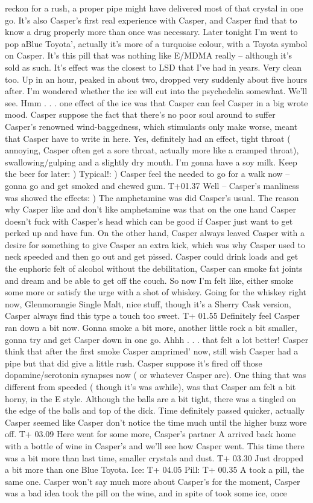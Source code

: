 \documentclass[12pt]{book}
\begin{document}
reckon for a rush, a proper pipe might have delivered most of that crystal in one go. It's also Casper's first real experience with Casper, and Casper find that to know a drug properly more than once was necessary. Later tonight I'm went to pop aBlue Toyota', actually it's more of a turquoise colour, with a Toyota symbol on Casper. It's this pill that was nothing like E/MDMA really -- although it's sold as such. It's effect was the closest to LSD that I've had in years. Very clean too. Up in an hour, peaked in about two, dropped very suddenly about five hours after. I'm wondered whether the ice will cut into the psychedelia somewhat. We'll see. Hmm . . .  one effect of the ice was that Casper can feel Casper in a big wrote mood. Casper suppose the fact that there's no poor soul around to suffer Casper's renowned wind-baggedness, which stimulants only make worse, meant that Casper have to write in here. Yes, definitely had an effect, tight throat ( annoying, Casper often get a sore throat, actually more like a cramped throat), swallowing/gulping and a slightly dry mouth. I'm gonna have a soy milk. Keep the beer for later: ) Typical!: ) Casper feel the needed to go for a walk now -- gonna go and get smoked and chewed gum. T+01.37 Well -- Casper's manliness was showed the effects: ) The amphetamine was did Casper's usual. The reason why Casper like and don't like amphetamine was that on the one hand Casper doesn't fuck with Casper's head which can be good if Casper just want to get perked up and have fun. On the other hand, Casper always leaved Casper with a desire for something to give Casper an extra kick, which was why Casper used to neck speeded and then go out and get pissed. Casper could drink loads and get the euphoric felt of alcohol without the debilitation, Casper can smoke fat joints and dream and be able to get off the couch. So now I'm felt like, either smoke some more or satisfy the urge with a shot of whiskey. Going for the whiskey right now, Glenmorangie Single Malt, nice stuff, though it's a Sherry Cask version, Casper always find this type a touch too sweet. T+ 01.55 Definitely feel Casper ran down a bit now. Gonna smoke a bit more, another little rock a bit smaller, gonna try and get Casper down in one go. Ahhh . . .  that felt a lot better! Casper think that after the first smoke Casper amprimed' now, still wish Casper had a pipe but that did give a little rush. Casper suppose it's fired off those dopamine/serotonin synapses now ( or whatever Casper are). One thing that was different from speeded ( though it's was awhile), was that Casper am felt a bit horny, in the E style. Although the balls are a bit tight, there was a tingled on the edge of the balls and top of the dick. Time definitely passed quicker, actually Casper seemed like Casper don't notice the time much until the higher buzz wore off. T+ 03.09 Here went for some more, Casper's partner A arrived back home with a bottle of wine in Casper's and we'll see how Casper went. This time there was a bit more than last time, smaller crystals and dust. T+ 03.30 Just dropped a bit more than one Blue Toyota. Ice: T+ 04.05 Pill: T+ 00.35 A took a pill, the same one. Casper won't say much more about Casper's for the moment, Casper was a bad idea took the pill on the wine, and in spite of took some ice, once 
\end{document}
